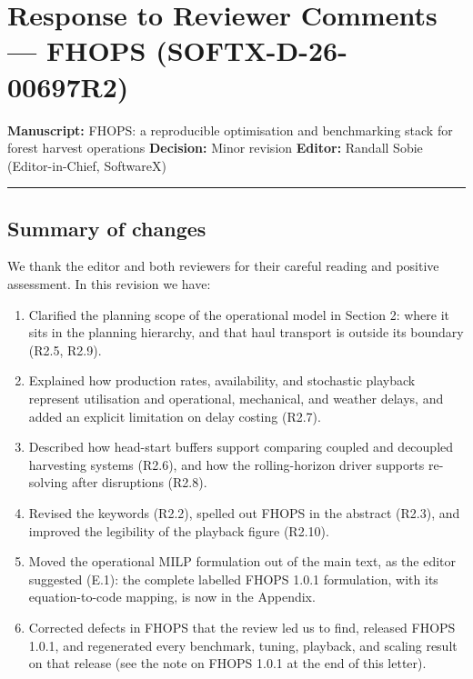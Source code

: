 \section*{Response to Reviewer Comments --- FHOPS
(SOFTX-D-26-00697R2)}\label{response-to-reviewer-comments-fhops-softx-d-26-00697r2}

\textbf{Manuscript:} FHOPS: a reproducible optimisation and benchmarking
stack for forest harvest operations \textbf{Decision:} Minor revision
\textbf{Editor:} Randall Sobie (Editor-in-Chief, SoftwareX)

\begin{center}\rule{0.5\linewidth}{0.5pt}\end{center}

\subsection*{Summary of changes}\label{summary-of-changes}

We thank the editor and both reviewers for their careful reading and
positive assessment. In this revision we have:

\begin{enumerate}
\def\labelenumi{\arabic{enumi}.}
\tightlist
\item
  Clarified the planning scope of the operational model in Section 2:
  where it sits in the planning hierarchy, and that haul transport is
  outside its boundary (R2.5, R2.9).
\item
  Explained how production rates, availability, and stochastic playback
  represent utilisation and operational, mechanical, and weather delays,
  and added an explicit limitation on delay costing (R2.7).
\item
  Described how head-start buffers support comparing coupled and
  decoupled harvesting systems (R2.6), and how the rolling-horizon
  driver supports re-solving after disruptions (R2.8).
\item
  Revised the keywords (R2.2), spelled out FHOPS in the abstract (R2.3),
  and improved the legibility of the playback figure (R2.10).
\item
  Moved the operational MILP formulation out of the main text, as the
  editor suggested (E.1): the complete labelled FHOPS 1.0.1 formulation,
  with its equation-to-code mapping, is now in the Appendix.
\item
  Corrected defects in FHOPS that the review led us to find, released
  FHOPS 1.0.1, and regenerated every benchmark, tuning, playback, and
  scaling result on that release (see the note on FHOPS 1.0.1 at the end
  of this letter).
\end{enumerate}


